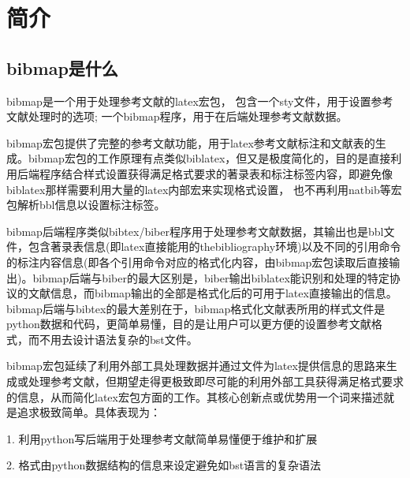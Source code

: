 \documentclass{article}
\begin{document}
\thispagestyle{empty}
\begin{center}

\vspace{0.3cm}


\end{center}

\section{简介}

\subsection{bibmap是什么}

bibmap是一个用于处理参考文献的latex宏包，
包含一个sty文件，用于设置参考文献处理时的选项;
一个bibmap程序，用于在后端处理参考文献数据。

bibmap宏包提供了完整的参考文献功能，用于latex参考文献标注和文献表的生成。bibmap宏包的工作原理有点类似biblatex，但又是极度简化的，目的是直接利用后端程序结合样式设置获得满足格式要求的著录表和标注标签内容，即避免像biblatex那样需要利用大量的latex内部宏来实现格式设置，
也不再利用natbib等宏包解析bbl信息以设置标注标签。

bibmap后端程序类似bibtex/biber程序用于处理参考文献数据，其输出也是bbl文件，包含著录表信息(即latex直接能用的thebibliography环境)以及不同的引用命令的标注内容信息(即各个引用命令对应的格式化内容，由bibmap宏包读取后直接输出)。bibmap后端与biber的最大区别是，biber输出biblatex能识别和处理的特定协议的文献信息，而bibmap输出的全部是格式化后的可用于latex直接输出的信息。bibmap后端与bibtex的最大差别在于，bibmap格式化文献表所用的样式文件是python数据和代码，更简单易懂，目的是让用户可以更方便的设置参考文献格式，而不用去设计语法复杂的bst文件。

bibmap宏包延续了利用外部工具处理数据并通过文件为latex提供信息的思路来生成或处理参考文献，但期望走得更极致即尽可能的利用外部工具获得满足格式要求的信息，从而简化latex宏包方面的工作。其核心创新点或优势用一个词来描述就是追求极致简单。具体表现为：

1. 利用python写后端用于处理参考文献简单易懂便于维护和扩展

2. 格式由python数据结构的信息来设定避免如bst语言的复杂语法
\end{document}
